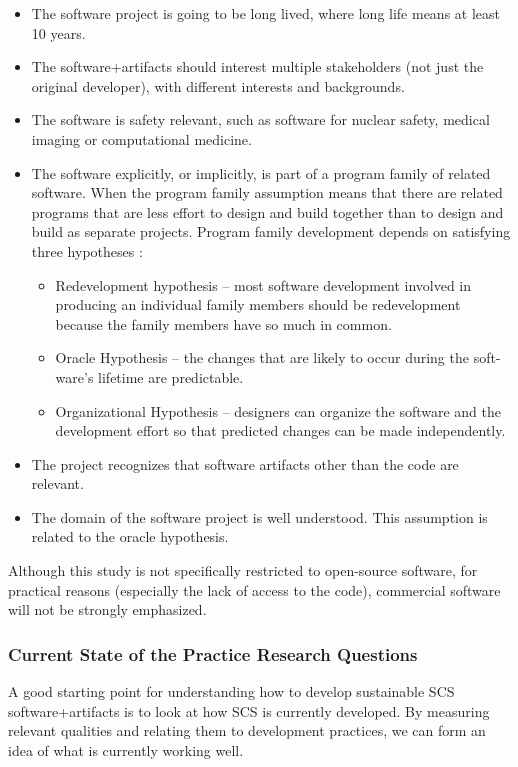 \documentclass[12pt]{article}
\begin{document}
\begin{itemize}
\item The software project is going to be long lived, where long life means at
  least 10 years.
\item The software+artifacts should interest multiple stakeholders (not just the
  original developer), with different interests and backgrounds.
\item The software is safety relevant, such as software for nuclear safety,
  medical imaging or computational medicine.
\item The software explicitly, or implicitly, is part of a program family of
  related software.  When the program family assumption means that there are
  related programs that are less effort to design and build together than to
  design and build as separate projects.  Program family development depends on
  satisfying three hypotheses \citep{Weiss1997}:
\begin{itemize}
\item Redevelopment hypothesis – most software development involved in producing
  an individual family members should be redevelopment because the family
  members have so much in common.
\item Oracle Hypothesis – the changes that are likely to occur during the soft-
  ware’s lifetime are predictable.
\item Organizational Hypothesis – designers can organize the software and the
  development effort so that predicted changes can be made independently.
\end{itemize}
\item The project recognizes that software artifacts other than the code are
  relevant.
\item The domain of the software project is well understood.  This assumption is
  related to the oracle hypothesis.
\end{itemize}

Although this study is not specifically restricted to open-source software, for
practical reasons (especially the lack of access to the code), commercial
software will not be strongly emphasized.

\subsubsection*{Current State of the Practice Research Questions}

A good starting point for understanding how to develop sustainable SCS software+artifacts is
to look at how SCS is currently developed.  By measuring relevant qualities and
relating them to development practices, we can form an idea of what is currently
working well.
\end{document}
